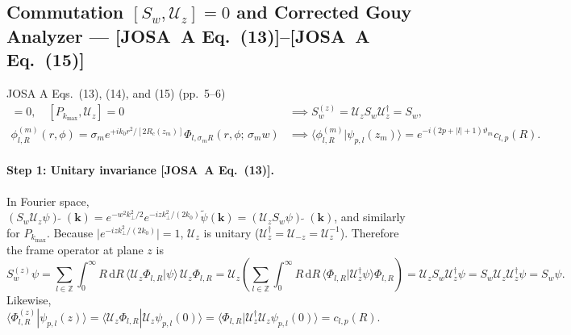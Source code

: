 \documentclass[10pt,letterpaper]{article}
\newcommand{\braket}[2]{\langle #1 | #2 \rangle}
\newcommand{\abs}[1]{\lvert #1 \rvert}
\newcommand{\dd}{\mathrm{d}}
\newcommand{\josa}[1]{\textbf{[JOSA~A Eq.~(#1)]}}
\numberwithin{equation}{section}
\begin{document}
\subsection{Commutation $[S_w,\mathcal{U}_z] = 0$ and Corrected Gouy Analyzer --- \josa{13}--\josa{15}}
\label{sec:s4_commute}

\begin{targeteq}{JOSA A Eqs.~(13), (14), and (15) (pp.~5--6)}
\begin{align*}
  [S_w, \mathcal{U}_z] = 0, \quad [P_{k_{\max}}, \mathcal{U}_z] = 0 &\implies S_w^{(z)} = \mathcal{U}_z S_w \mathcal{U}_z^\dagger = S_w, \\
  \phi_{l,R}^{(m)}(r,\phi) = \sigma_m e^{+ik_0 r^2/[2R_c(z_m)]}\Phi_{l,\sigma_m R}(r,\phi;\,\sigma_m w) &\implies \braket{\phi_{l,R}^{(m)}}{\psi_{p,l}(z_m)} = e^{-i(2p+\abs{l}+1)\vartheta_m} c_{l,p}(R).
\end{align*}
\end{targeteq}

\paragraph*{Step 1: Unitary invariance \josa{13}.}
In Fourier space, $(S_w\mathcal{U}_z\psi)\,\widetilde{}\;(\mathbf{k}) = e^{-w^2 k_\perp^2/2} e^{-iz k_\perp^2/(2k_0)}\widetilde{\psi}(\mathbf{k}) = (\mathcal{U}_z S_w\psi)\,\widetilde{}\;(\mathbf{k})$, and similarly for $P_{k_{\max}}$. Because $\abs{e^{-iz k_\perp^2/(2k_0)}} = 1$, $\mathcal{U}_z$ is unitary ($\mathcal{U}_z^\dagger = \mathcal{U}_{-z} = \mathcal{U}_z^{-1}$). Therefore the frame operator at plane $z$ is
\begin{equation}
  S_w^{(z)}\psi = \sum_{l\in\mathbb{Z}}\int_0^\infty R\,\dd R\,\braket{\mathcal{U}_z\Phi_{l,R}}{\psi}\,\mathcal{U}_z\Phi_{l,R} = \mathcal{U}_z\left(\sum_{l\in\mathbb{Z}}\int_0^\infty R\,\dd R\,\braket{\Phi_{l,R}}{\mathcal{U}_z^\dagger\psi}\Phi_{l,R}\right) = \mathcal{U}_z S_w \mathcal{U}_z^\dagger\psi = S_w\mathcal{U}_z\mathcal{U}_z^\dagger\psi = S_w\psi.
\end{equation}
Likewise, $\braket{\Phi_{l,R}^{(z)}}{\psi_{p,l}(z)} = \braket{\mathcal{U}_z\Phi_{l,R}}{\mathcal{U}_z\psi_{p,l}(0)} = \braket{\Phi_{l,R}}{\mathcal{U}_z^\dagger\mathcal{U}_z\psi_{p,l}(0)} = c_{l,p}(R)$.
\end{document}
